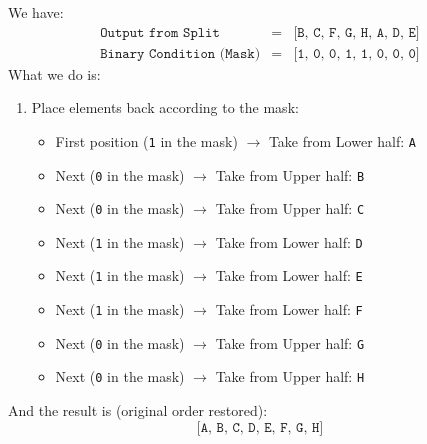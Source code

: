 \begin{examplebox}
    We have:
    \begin{equation*}
        \begin{array}{rcl}
            \texttt{Output from Split} &=& \texttt{[B, C, F, G, H, A, D, E]} \\ [.5em]
            \texttt{Binary Condition (Mask)} &=& \texttt{[1, 0, 0, 1, 1, 0, 0, 0]}
        \end{array}
    \end{equation*}
    What we do is:
    \begin{enumerate}
        \item Place elements back according to the mask:
        \begin{itemize}
            \item First position (\texttt{1} in the mask) $\rightarrow$ Take from Lower half: \texttt{A}
            \item Next (\texttt{0} in the mask) $\rightarrow$ Take from Upper half: \texttt{B}
            \item Next (\texttt{0} in the mask) $\rightarrow$ Take from Upper half: \texttt{C}
            \item Next (\texttt{1} in the mask) $\rightarrow$ Take from Lower half: \texttt{D}
            \item Next (\texttt{1} in the mask) $\rightarrow$ Take from Lower half: \texttt{E}
            \item Next (\texttt{1} in the mask) $\rightarrow$ Take from Lower half: \texttt{F}
            \item Next (\texttt{0} in the mask) $\rightarrow$ Take from Upper half: \texttt{G}
            \item Next (\texttt{0} in the mask) $\rightarrow$ Take from Upper half: \texttt{H}
        \end{itemize}
    \end{enumerate}
    And the result is (original order restored):
    \begin{equation*}
        \texttt{[A, B, C, D, E, F, G, H]}
    \end{equation*}
\end{examplebox}

